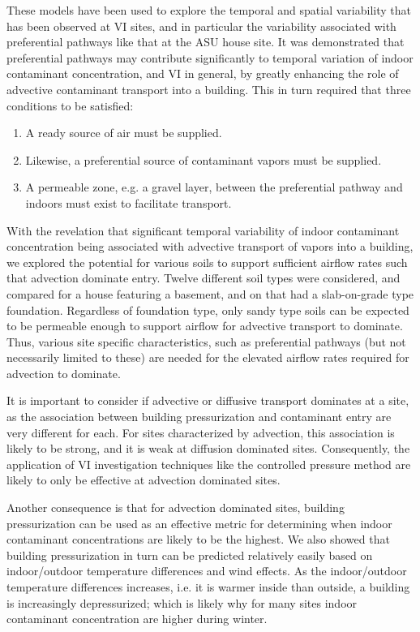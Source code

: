 These models have been used to explore the temporal and spatial variability that has been observed at VI sites, and in particular the variability associated with preferential pathways like that at the ASU house site.
It was demonstrated that preferential pathways may contribute significantly to temporal variation of indoor contaminant concentration, and VI in general, by greatly enhancing the role of advective contaminant transport into a building.
This in turn required that three conditions to be satisfied:
\begin{enumerate}
  \item A ready source of air must be supplied.
  \item Likewise, a preferential source of contaminant vapors must be supplied.
  \item A permeable zone, e.g. a gravel layer, between the preferential pathway and indoors must exist to facilitate transport.
\end{enumerate}\par

With the revelation that significant temporal variability of indoor contaminant concentration being associated with advective transport of vapors into a building, we explored the potential for various soils to support sufficient airflow rates such that advection dominate entry.
Twelve different soil types were considered, and compared for a house featuring a basement, and on that had a slab-on-grade type foundation.
Regardless of foundation type, only sandy type soils can be expected to be permeable enough to support airflow for advective transport to dominate.
Thus, various site specific characteristics, such as preferential pathways (but not necessarily limited to these) are needed for the elevated airflow rates required for advection to dominate.\par

It is important to consider if advective or diffusive transport dominates at a site, as the association between building pressurization and contaminant entry are very different for each.
For sites characterized by advection, this association is likely to be strong, and it is weak at diffusion dominated sites.
Consequently, the application of VI investigation techniques like the controlled pressure method are likely to only be effective at advection dominated sites.\par

Another consequence is that for advection dominated sites, building pressurization can be used as an effective metric for determining when indoor contaminant concentrations are likely to be the highest.
We also showed that building pressurization in turn can be predicted relatively easily based on indoor/outdoor temperature differences and wind effects.
As the indoor/outdoor temperature differences increases, i.e. it is warmer inside than outside, a building is increasingly depressurized; which is likely why for many sites indoor contaminant concentration are higher during winter.\par

